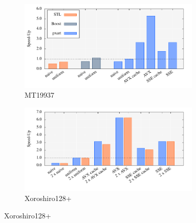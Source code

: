 \documentclass{stdlocal}
\begin{document}
    \begin{figure}
      \center
      \begin{subfigure}[b]{\textwidth}
        \center
        \includegraphics[width=0.95\textwidth]{plots/monte_carlo_pi_desktop_mt19937.pdf}
        \caption{MT19937}
      \end{subfigure}

      \begin{subfigure}[b]{\textwidth}
        \center
        \includegraphics[width=0.95\textwidth]{plots/monte_carlo_pi_desktop_xrsr128p.pdf}
        \caption{Xoroshiro128+}
      \end{subfigure}


\end{figure}
\end{document}
